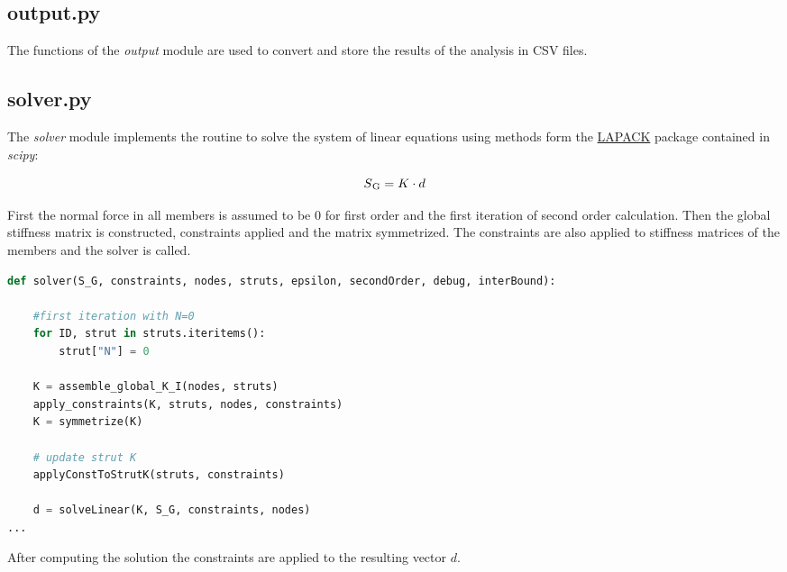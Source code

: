\subsection{output.py}
\label{subsec:output.py}

The functions of the \textit{output} module are used to convert and store the results of the analysis in CSV files.

\pagebreak

\subsection{solver.py}
\label{subsec:solver.py}

The \textit{solver} module implements the routine to solve the system of linear equations using methods form the \href{http://www.netlib.org/lapack/}{LAPACK} package contained in \textit{scipy}:

\begin{equation}
S\textsubscript{G} = K \cdot d
\end{equation}

First the normal force in all members is assumed to be $0$ for first order and the first iteration of second order calculation.
Then the global stiffness matrix is constructed, constraints applied and the matrix symmetrized.
The constraints are also applied to stiffness matrices of the members and the solver is called.

\begin{inconsolata}
\begin{minipage}{\linewidth}
\begin{lstlisting}[language=python]
def solver(S_G, constraints, nodes, struts, epsilon, secondOrder, debug, interBound):

    #first iteration with N=0
    for ID, strut in struts.iteritems():
        strut["N"] = 0

    K = assemble_global_K_I(nodes, struts)
    apply_constraints(K, struts, nodes, constraints)
    K = symmetrize(K)

    # update strut K
    applyConstToStrutK(struts, constraints)

    d = solveLinear(K, S_G, constraints, nodes)
...
\end{lstlisting}
\end{minipage}
\end{inconsolata}

\pagebreak

After computing the solution the constraints are applied to the resulting vector $d$.

